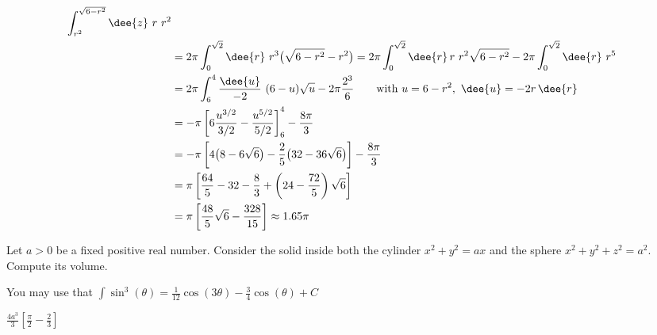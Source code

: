 \begin{solution}
\begin{align*}
   \int_{r^2}^{\sqrt{6-r^2}} \dee{z}\ r\ r^2 \\
&=2\pi\int_0^{\sqrt{2}}\dee{r}  \ r^3\big(\sqrt{6-r^2}-r^2\big)
 =2\pi\int_0^{\sqrt{2}}\dee{r}\,r\ r^2\sqrt{6-r^2}
   - 2\pi\int_0^{\sqrt{2}}\dee{r}  \ r^5\\
&=2\pi\int_6^4\frac{\dee{u}}{-2}  \ (6-u)\sqrt{u} -2\pi\frac{2^3}{6}
\qquad\text{with } u = 6-r^2,\ \dee{u} = -2r\,\dee{r} \\
&=-\pi\left[6\frac{u^{3/2}}{3/2}-\frac{u^{5/2}}{5/2}\right]_6^4-\frac{8\pi}{3}\\
&=-\pi\left[4\big(8-6\sqrt{6}\big)-\frac{2}{5}\big(32-36\sqrt{6}\big)\right]
             -\frac{8\pi}{3}\\
&=\pi\left[\frac{64}{5}-32-\frac{8}{3} 
         +\left(24-\frac{72}{5}\right)\sqrt{6}\right] \\
&=\pi\left[\frac{48}{5}\sqrt{6}-\frac{328}{15}\right] 
\approx 1.65\pi
\end{align*}
\end{solution}

\begin{question}[M200 2013D] %
Let $a > 0$ be a fixed positive real number. Consider the solid inside 
both the cylinder $x^2 + y^2 = ax$ and the sphere $x^2 + y^2 + z^2 = a^2$.
Compute its volume.

You may use that 
    $\int \sin^3(\theta) =\frac{1}{12}\cos(3\theta) -\frac{3}{4}\cos(\theta) +C$

\end{question}

%

\begin{answer}
$\frac{4a^3}{3}\left[\frac{\pi}{2}  - \frac{2}{3} \right]$
\end{answer}

